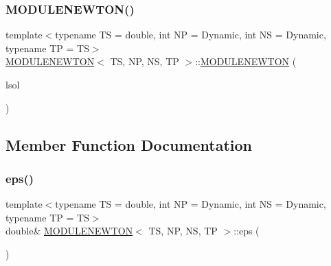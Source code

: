 \subsubsection{\texorpdfstring{M\+O\+D\+U\+L\+E\+N\+E\+W\+T\+O\+N()}{MODULENEWTON()}}
{\footnotesize\ttfamily template$<$typename TS = double, int NP = Dynamic, int NS = Dynamic, typename TP = TS$>$ \\
\mbox{\hyperlink{class_m_o_d_u_l_e_n_e_w_t_o_n}{M\+O\+D\+U\+L\+E\+N\+E\+W\+T\+ON}}$<$ TS, NP, NS, TP $>$\+::\mbox{\hyperlink{class_m_o_d_u_l_e_n_e_w_t_o_n}{M\+O\+D\+U\+L\+E\+N\+E\+W\+T\+ON}} (\begin{DoxyParamCaption}\item[{\mbox{\hyperlink{class_l_i_n_e_a_r___s_o_l_v_e_r}{L\+I\+N\+E\+A\+R\+\_\+\+S\+O\+L\+V\+ER}}$<$ TS, NS $>$ \&}]{lsol }\end{DoxyParamCaption})\hspace{0.3cm}{\ttfamily [inline]}}



\subsection{Member Function Documentation}
\mbox{\label{class_m_o_d_u_l_e_n_e_w_t_o_n_a2df80239a016b8216c167bfe026e76b4}} 
\subsubsection{\texorpdfstring{eps()}{eps()}}
{\footnotesize\ttfamily template$<$typename TS = double, int NP = Dynamic, int NS = Dynamic, typename TP = TS$>$ \\
double\& \mbox{\hyperlink{class_m_o_d_u_l_e_n_e_w_t_o_n}{M\+O\+D\+U\+L\+E\+N\+E\+W\+T\+ON}}$<$ TS, NP, NS, TP $>$\+::eps (\begin{DoxyParamCaption}{ }\end{DoxyParamCaption})\hspace{0.3cm}{\ttfamily [inline]}}

